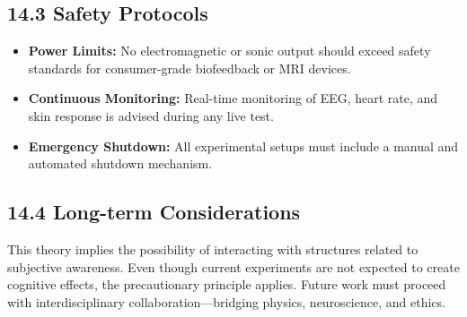 \subsection*{14.3 Safety Protocols}

\begin{itemize}
  \item \textbf{Power Limits:} No electromagnetic or sonic output should exceed safety standards for consumer-grade biofeedback or MRI devices.
  \item \textbf{Continuous Monitoring:} Real-time monitoring of EEG, heart rate, and skin response is advised during any live test.
  \item \textbf{Emergency Shutdown:} All experimental setups must include a manual and automated shutdown mechanism.
\end{itemize}

\subsection*{14.4 Long-term Considerations}

This theory implies the possibility of interacting with structures related to subjective awareness. Even though current experiments are not expected to create cognitive effects, the precautionary principle applies. Future work must proceed with interdisciplinary collaboration—bridging physics, neuroscience, and ethics.

